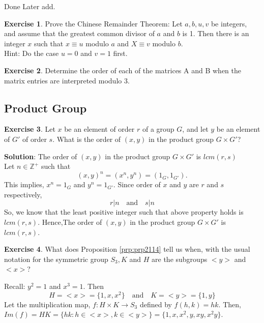 \documentclass[
]{book}
\theoremstyle{definition}
\theoremstyle{definition}
\theoremstyle{definition}
\newtheorem{exercise}{Exercise}[chapter]
\theoremstyle{definition}
\theoremstyle{remark}
\begin{document}
Done Later add.

\begin{exercise}
\protect\hypertarget{exr:unnamed-chunk-81}{}\label{exr:unnamed-chunk-81}Prove the Chinese Remainder Theorem: Let \(a, b, u, v\) be integers, and assume that the greatest common divisor of \(a\) and \(b\) is 1. Then there is an integer \(x\) such that \(x \equiv u\) modulo \(a\) and \(X \equiv v\) modulo \(b\).\\
Hint: Do the case \(u = 0\) and \(v = 1\) first.
\end{exercise}

\begin{exercise}
\protect\hypertarget{exr:unnamed-chunk-82}{}\label{exr:unnamed-chunk-82}Determine the order of each of the matrices A and B when the matrix entries are interpreted modulo 3.
\end{exercise}

\hypertarget{product-group}{%
\subsection{Product Group}\label{product-group}}

\begin{exercise}
\protect\hypertarget{exr:unnamed-chunk-83}{}\label{exr:unnamed-chunk-83}Let \(x\) be an element of order \(r\) of a group \(G\), and let \(y\) be an element of \(G'\) of order \(s\). What is the order of \((x, y)\) in the product group \(G \times G'\)?
\end{exercise}

\textbf{Solution}: The order of \((x, y)\) in the product group \(G \times G'\) is \(lcm(r,s)\)\\
Let \(n\in \mathbb{Z}^+\) such that \[(x,y)^n=(x^n,y^n)=(1_G,1_{G'}).\]
This implies, \(x^n=1_G\) and \(y^n=1_{G'}\). Since order of \(x\) and \(y\) are \(r\) and \(s\) respectively,
\[r|n~~~\text{ and }~~~s|n\]
So, we know that the least positive integer such that above property holds is \(lcm(r,s)\). Hence,The order of \((x, y)\) in the product group \(G \times G'\) is \(lcm(r,s)\).

\begin{exercise}
\protect\hypertarget{exr:unnamed-chunk-84}{}\label{exr:unnamed-chunk-84}What does Proposition \ref{prp:prp2114} tell us when, with the usual notation for the symmetric
group \(S_3,K\) and \(H\) are the subgroups \(<y>\) and \(<x>\)?
\end{exercise}

Recall: \(y^2=1\) and \(x^3=1\). Then
\[H=<x>=\{1,x,x^2\}~~~\text{ and }~~~ K=<y>=\{1,y\}\]
Let the multiplication map, \(f:H\times K \to S_3\) defined by \(f(h,k)=hk\). Then,
\(Im(f)=HK=\{hk:h\in <x>, k\in <y>\}=\{1,x,x^2,y,xy,x^2y\}\).
\end{document}
